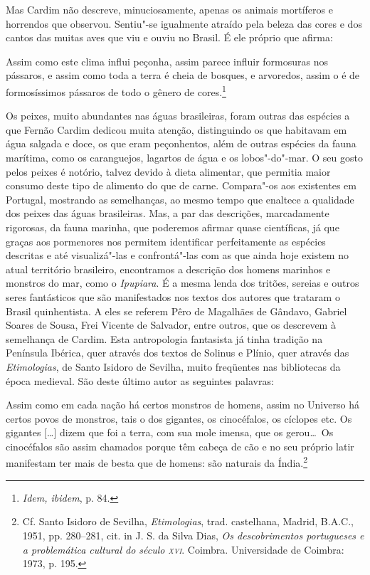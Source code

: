 Mas Cardim não descreve, minuciosamente, apenas os animais
mortíferos e horrendos que observou. Sentiu"-se igualmente atraído pela
beleza das cores e dos cantos das muitas aves que viu e ouviu no
Brasil. É ele próprio que afirma:

\begin{hedraquote}
Assim como este clima influi peçonha, assim parece influir formosuras nos pássaros, e assim
como toda a terra é cheia de bosques, e arvoredos, assim o é de formosíssimos pássaros de 
todo o gênero de cores.\footnote{  \textit{Idem, ibidem}, p. 84.}
\end{hedraquote}

 Os peixes, muito abundantes nas águas brasileiras, foram
outras das espécies a que Fernão Cardim dedicou muita atenção,
distinguindo os que habitavam em água salgada e doce, os que eram
peçonhentos, além de outras espécies da fauna marítima, como os
caranguejos, lagartos de água e os lobos"-do"-mar. O seu gosto pelos
peixes é notório, talvez devido à dieta alimentar, que permitia maior
consumo deste tipo de alimento do que de carne. Compara"-os aos
existentes em Portugal, mostrando as semelhanças, ao mesmo tempo que
enaltece a qualidade dos peixes das águas brasileiras. Mas, a par das
descrições, marcadamente rigorosas, da fauna marinha, que poderemos
afirmar quase científicas, já que graças aos pormenores nos permitem
identificar perfeitamente as espécies descritas e até visualizá"-las e
confrontá"-las com as que ainda hoje existem no atual território
brasileiro, encontramos a descrição dos homens marinhos e monstros do
mar, como o \textit{Ipupiara}. É a mesma lenda dos tritões,
sereias e outros seres fantásticos que são manifestados nos textos dos
autores que trataram o Brasil quinhentista. A eles se referem Pêro de
Magalhães de Gândavo, Gabriel Soares de Sousa, Frei Vicente de
Salvador, entre outros, que os descrevem à semelhança de Cardim. Esta
antropologia fantasista já tinha tradição na Península Ibérica, quer
através dos textos de Solinus e Plínio, quer através das
\textit{Etimologias}, de Santo Isidoro de Sevilha, muito freqüentes nas
bibliotecas da época medieval. São deste último autor as seguintes palavras:

\begin{hedraquote}
Assim como em cada nação há certos monstros de homens,
assim no Universo há certos povos de monstros, tais o dos gigantes, os
cinocéfalos, os cíclopes etc. Os gigantes [\ldots] dizem que foi a terra,
com sua mole imensa, que os gerou\ldots\ Os cinocéfalos são assim chamados
porque têm cabeça de cão e no seu próprio latir manifestam ter mais de
besta que de homens: são naturais da Índia.\footnote{ Cf. Santo Isidoro 
de Sevilha, \textit{Etimologias}, trad. castelhana, Madrid, B.A.C., 1951, 
pp. 280--281, cit. in J. S. da Silva Dias, \textit{Os descobrimentos portugueses 
e a problemática cultural do século \textsc{xvi}}. Coimbra. Universidade de Coimbra: 1973, p. 195.}
\end{hedraquote}

